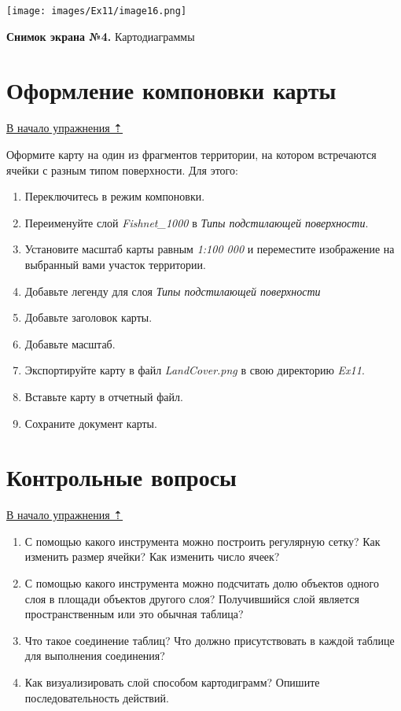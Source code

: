 \documentclass[12pt,]{book}
\begin{document}
\texttt{[image: images/Ex11/image16.png]}

\textbf{Снимок экрана №4.} Картодиаграммы

\hypertarget{land-cover-hydro-layout}{%
\section{Оформление компоновки карты}\label{land-cover-hydro-layout}}

\protect\hyperlink{land-cover-hydro}{В начало упражнения ⇡}

Оформите карту на один из фрагментов территории, на котором встречаются ячейки с разным типом поверхности. Для этого:

\begin{enumerate}
\def\labelenumi{\arabic{enumi}.}
\item
  Переключитесь в режим компоновки.
\item
  Переименуйте слой \emph{Fishnet\_1000} в \emph{Типы подстилающей поверхности}.
\item
  Установите масштаб карты равным \emph{1:100 000} и переместите изображение на выбранный вами участок территории.
\item
  Добавьте легенду для слоя \emph{Типы подстилающей поверхности}
\item
  Добавьте заголовок карты.
\item
  Добавьте масштаб.
\item
  Экспортируйте карту в файл \emph{LandCover.png} в свою директорию \emph{Ex11}.
\item
  Вставьте карту в отчетный файл.
\item
  Сохраните документ карты.
\end{enumerate}

\hypertarget{land-cover-hydro-questions}{%
\section{Контрольные вопросы}\label{land-cover-hydro-questions}}

\protect\hyperlink{land-cover-hydro}{В начало упражнения ⇡}

\begin{enumerate}
\def\labelenumi{\arabic{enumi}.}
\item
  С помощью какого инструмента можно построить регулярную сетку? Как изменить размер ячейки? Как изменить число ячеек?
\item
  С помощью какого инструмента можно подсчитать долю объектов одного слоя в площади объектов другого слоя? Получившийся слой является пространственным или это обычная таблица?
\item
  Что такое соединение таблиц? Что должно присутствовать в каждой таблице для выполнения соединения?
\item
  Как визуализировать слой способом картодиграмм? Опишите последовательность действий.
\end{enumerate}
\end{document}

